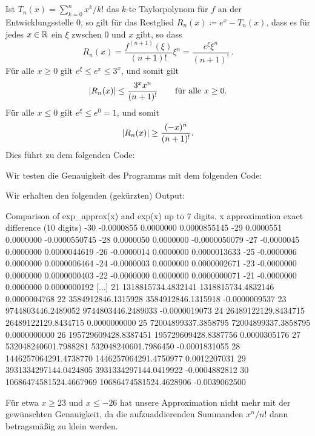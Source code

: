 \section{}

Ist $T_n(x) = \sum_{k=0}^n x^k/k!$ das $k$-te Taylorpolynom für $f$ an der Entwicklungsstelle $0$, so gilt für das Restglied $R_n(x) \coloneqq e^x - T_n(x)$, dass es für jedes $x \in \mathbb{R}$ ein $\xi$ zwschen $0$ und $x$ gibt, so dass
\[
    R_n(x)
  = \frac{f^{(n+1)}(\xi)}{(n+1)!} \xi^n
  = \frac{e^\xi \xi^n}{(n+1)^!}\,.
\]
Für alle $x \geq 0$ gilt $e^\xi \leq e^x \leq 3^x$, und somit gilt
\[
        \lvert R_n(x)\rvert
  \leq  \frac{3^x x^n}{(n+1)^!}
  \qquad
  \text{für alle $x \geq 0$}.
\]
Für alle $x \leq 0$ gilt $e^\xi \leq e^0 = 1$, und somit
\[
        \lvert R_n(x)\rvert
  \geq  \frac{(-x)^n}{(n+1)^!}.
\]
Dies führt zu dem folgenden Code:



Wir testen die Genauigkeit des Programms mit dem folgenden Code:



Wir erhalten den folgenden (gekürzten) Output:
\begin{consoleoutput}
Comparison of exp_approx(x) and exp(x) up to 7 digits.
  x            approximation                    exact   difference (10 digits)
-30               -0.0000855                0.0000000    0.0000855145
-29                0.0000551                0.0000000   -0.0000550745
-28                0.0000050                0.0000000   -0.0000050079
-27               -0.0000045                0.0000000    0.0000044619
-26               -0.0000014                0.0000000    0.0000013633
-25               -0.0000006                0.0000000    0.0000006464
-24               -0.0000003                0.0000000    0.0000002671
-23               -0.0000000                0.0000000    0.0000000403
-22               -0.0000000                0.0000000    0.0000000071
-21               -0.0000000                0.0000000    0.0000000192
[...]
 21       1318815734.4832141       1318815734.4832146    0.0000004768
 22       3584912846.1315928       3584912846.1315918   -0.0000009537
 23       9744803446.2489052       9744803446.2489033   -0.0000019073
 24      26489122129.8434715      26489122129.8434715    0.0000000000
 25      72004899337.3858795      72004899337.3858795    0.0000000000
 26     195729609428.8387451     195729609428.8387756    0.0000305176
 27     532048240601.7988281     532048240601.7986450   -0.0001831055
 28    1446257064291.4738770    1446257064291.4750977    0.0012207031
 29    3931334297144.0424805    3931334297144.0419922   -0.0004882812
 30   10686474581524.4667969   10686474581524.4628906   -0.0039062500
\end{consoleoutput}

Für etwa $x \geq 23$ und $x \leq -26$ hat unsere Approximation nicht mehr mit der gewünschten Genauigkeit, da die aufzuaddierenden Summanden $x^n/n!$ dann betragsmäßig zu klein werden.
